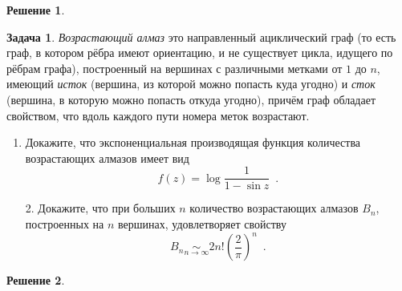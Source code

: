 \documentclass[a5paper]{article}
\theoremstyle{definition}
\newtheorem{problem}{Задача}
\newtheorem*{solution}{Решение}
\begin{document}
\begin{solution}
\end{solution}

\noindent\begin{minipage}{0.6\textwidth}
\begin{problem}
\emph{Возрастающий алмаз} это
направленный ациклический граф (то есть граф, в котором рёбра имеют ориентацию, и
не существует цикла, идущего по рёбрам графа),
построенный на вершинах с различными метками от \( 1 \) до \( n \), имеющий
\textit{исток} (вершина, из которой можно попасть куда угодно) и \textit{сток}
(вершина, в которую можно попасть откуда угодно), причём граф обладает
свойством, что вдоль каждого пути номера меток возрастают.
\begin{enumerate}
\item Докажите, что экспоненциальная производящая функция количества
возрастающих алмазов имеет вид
\begin{equation}
    f(z) = \log \dfrac{1}{1 - \sin z}
    \enspace .
\end{equation}
\end{enumerate}
\end{problem}%
\end{minipage}%
\hfill%
\begin{minipage}{0.3\textwidth}\raggedleft
{}
\end{minipage}
\begin{enumerate}
\item[2.] 
Докажите, что при больших \( n \)
количество возрастающих алмазов \( B_n \), построенных на \( n \) вершинах,
удовлетворяет свойству
\begin{equation}
    B_n \underset{n \to \infty}{\sim} 2 n! \left( \frac{2}{\pi} \right)^n
    \enspace .
\end{equation}
\end{enumerate}
\begin{solution}

\end{solution}
\end{document}
